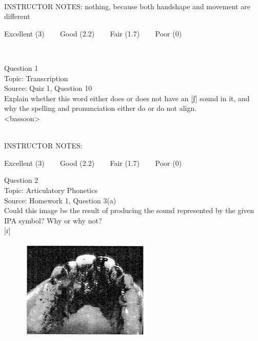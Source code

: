 \documentclass[12pt]{article}
\begin{document}
~\\
INSTRUCTOR NOTES: nothing, because both handshape and movement are different


\vfill
Excellent (3) ~~~ Good (2.2) ~~~ Fair (1.7) ~~~ Poor (0)
\newpage

\begin{center}
\textbf{{\color{red}{\HUGE END OF EXAM}}}\\

\end{center}
\newpage

\begin{center}
\textbf{{\color{blue}{\HUGE START OF EXAM\\}}}

\textbf{{\color{blue}{\HUGE Student ID: 44715\\}}}

\textbf{{\color{blue}{\HUGE \\}}}

\end{center}
\newpage

{\large Question 1}\\

Topic: Transcription\\
Source: Quiz 1, Question 10\\

Explain whether this word either does or does not have an [ʃ] sound in it, and why the spelling and pronunciation either do or do not align.\\

<bassoon>


~\\
INSTRUCTOR NOTES: 


\vfill
Excellent (3) ~~~ Good (2.2) ~~~ Fair (1.7) ~~~ Poor (0)
\newpage

{\large Question 2}\\

Topic: Articulatory Phonetics\\
Source: Homework 1, Question 3(a)\\

Could this image be the result of producing the sound represented by the given IPA symbol? Why or why not?\\

{[ɾ]}

\begin{figure}[H]
\includegraphics{../images/staticpalatography_stop.png}
\end{figure}
\end{document}
